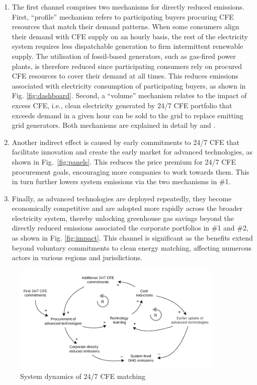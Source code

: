 \documentclass[pdflatex,sn-basic, Numbered]{sn-jnl}
\theoremstyle{thmstyleone}%
\theoremstyle{thmstyletwo}%
\theoremstyle{thmstylethree}%
\begin{document}
\begin{enumerate}
    \item The first channel comprises two mechanisms for directly reduced emissions. First, \enquote{profile} mechanism refers to participating buyers procuring CFE resources that match their demand patterns. When some consumers align their demand with CFE supply on an hourly basis, the rest of the electricity system requires less dispatchable generation to firm intermittent renewable supply. The utilisation of fossil-based generators, such as gas-fired power plants, is therefore reduced since participating consumers rely on procured CFE resources to cover their demand at all times. This reduces emissions associated with electricity consumption of participating buyers, as shown in Fig. \ref{fig:dashboard}.
    Second, a \enquote{volume} mechanism relates to the impact of excess CFE, i.e., clean electricity generated by 24/7 CFE portfolio that exceeds demand in a given hour can be sold to the grid to replace emitting grid generators. Both mechanisms are explained in detail by \citet{xu-247CFE-report} and \citet{riepinMeansCostsSystemlevel2024}.
    \item Another indirect effect is caused by early commitments to 24/7 CFE that facilitate innovation and create the early market for advanced technologies, as shown in Fig.~\ref{fig:panels}.
    This reduces the price premium for 24/7 CFE procurement goals, encouraging more companies to work towards them. This in turn further lowers system emissions via the two mechanisms in \#1.
    \item Finally, as advanced technologies are deployed repeatedly, they become economically competitive and are adopted more rapidly across the broader electricity system, thereby unlocking greenhouse gas savings beyond the directly reduced emissions associated the corporate portfolios in \#1 and \#2, as shown in Fig. \ref{fig:impact}. This channel is significant as the benefits extend beyond voluntary commitments to clean energy matching, affecting numerous actors in various regions and jurisdictions.
\end{enumerate}

\begin{figure}[h]
    \centering
    \includegraphics[width=0.9\textwidth]{images/virtuous_dynamics.pdf}
    \caption{System dynamics of 24/7 CFE matching}\label{fig:dynamics}
\end{figure}
\end{document}
